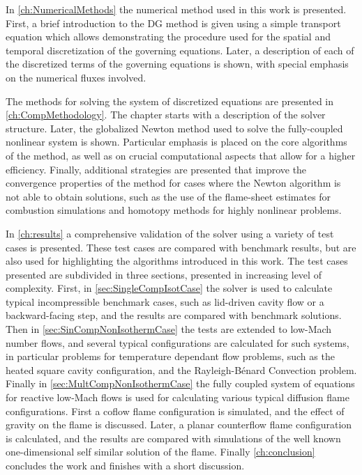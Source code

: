 In \cref{ch:NumericalMethods} the numerical method used in this work is presented. First, a brief introduction to the DG method is given using a simple transport equation which allows demonstrating the procedure used for the spatial and temporal discretization of the governing equations. Later, a description of each of the discretized terms of the governing equations is shown, with special emphasis on the numerical fluxes involved.

The methods for solving the system of discretized equations are presented in \cref{ch:CompMethodology}. The chapter starts with a description of the solver structure. Later, the globalized Newton method used to solve the fully-coupled nonlinear system is shown. Particular emphasis is placed on the core algorithms of the method, as well as on crucial computational aspects that allow for a higher efficiency. Finally, additional strategies are presented that improve the convergence properties of the method for cases where the Newton algorithm is not able to obtain solutions, such as the use of the flame-sheet estimates for combustion simulations and homotopy methods for highly nonlinear problems.

In \cref{ch:results} a comprehensive validation of the solver using a variety of test cases is presented. These test cases are compared with benchmark results, but are also used for highlighting the algorithms introduced in this work. The test cases presented are subdivided in three sections, presented in increasing level of complexity. First, in \cref{sec:SingleCompIsotCase} the solver is used to calculate typical incompressible benchmark cases, such as lid-driven cavity flow or a backward-facing step, and the results are compared with benchmark solutions. Then in \cref{sec:SinCompNonIsothermCase} the tests are extended to low-Mach number flows, and several typical configurations are calculated for such systems, in particular problems for temperature dependant flow problems, such as the heated square cavity configuration, and the Rayleigh-Bénard Convection problem.
Finally in \cref{sec:MultCompNonIsothermCase} the fully coupled system of equations for reactive low-Mach flows is used for calculating various typical diffusion flame configurations. First a coflow flame configuration is simulated, and the effect of gravity on the flame is discussed. Later, a planar counterflow flame configuration is calculated, and the results are compared with simulations of the well known one-dimensional self similar solution of the flame. Finally \cref{ch:conclusion} concludes the work and finishes with a short discussion.

